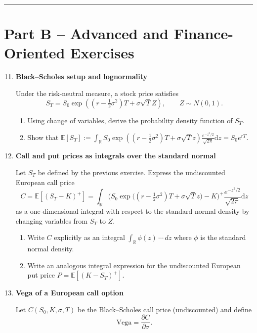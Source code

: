 \documentclass[11pt]{article}
\newcommand{\R}{\mathbb{R}}
\begin{document}
\bigskip
\hrule
\bigskip

\section*{Part B -- Advanced and Finance-Oriented Exercises}

\begin{enumerate}
\setcounter{enumi}{10} %

\item \textbf{Black--Scholes setup and lognormality}

Under the risk-neutral measure, a stock price satisfies
\[
 S_T = S_0\exp\left((r-\tfrac12\sigma^2)T+\sigma\sqrt{T}Z\right), \qquad Z\sim N(0,1).
\]

\begin{enumerate}
\item Using change of variables, derive the probability density function of \(S_T\).
\item Show that 
\(\mathbb{E}[S_T] :=
\int_{\R} 
S_0\exp\left((r-\tfrac12\sigma^2)T+\sigma\sqrt{T}z\right) \frac{e^{-z^2/2}}{\sqrt{2\pi}} 
\mathrm{d}z
=S_0e^{rT}\).
\end{enumerate}

\bigskip
\item \textbf{Call and put prices as integrals over the standard normal}

Let $S_T$ be defined by the previous exercise. 
Express the undiscounted European call price
\[
 C = \mathbb{E}[(S_T-K)^+]
 =
 \int_{\R} 
 \Big(
 S_0\exp\big( (r-\tfrac12\sigma^2)T+\sigma\sqrt{T}z\big) 
 -
 K
 \Big)^{+}
 \frac{e^{-z^2/2}}{\sqrt{2\pi}} 
\mathrm{d}z
\]
as a one-dimensional integral with respect to the standard normal density by changing variables from \(S_T\) to \(Z\).

\begin{enumerate}
\item Write \(C\) explicitly as an integral \(\int_{\mathbb{R}} \phi(z)\,\cdots\,dz\) where \(\phi\) is the standard normal density.
\item Write an analogous integral expression for the undiscounted European put price \(P = \mathbb{E}[(K-S_T)^+]\).
\end{enumerate}

\bigskip
\item \textbf{Vega of a European call option}

Let \(C(S_0,K,\sigma,T)\) be the Black--Scholes call price (undiscounted) and define
\[
\text{Vega} = \frac{\partial C}{\partial \sigma}.
\]


\end{enumerate}
\end{document}
